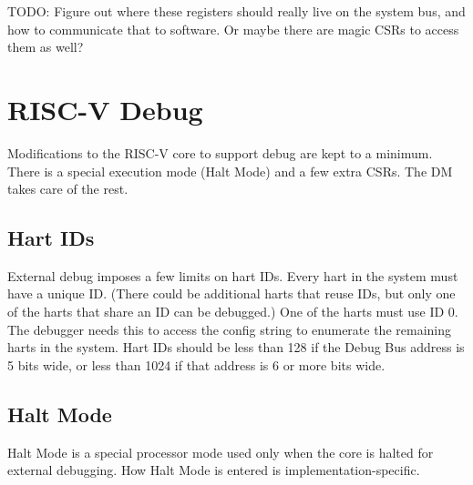 \documentclass{article}
\begin{document}
TODO: Figure out where these registers should really live on the system bus,
and how to communicate that to software. Or maybe there are magic CSRs to
access them as well?



%
%

\section{RISC-V Debug}

Modifications to the RISC-V core to support debug are kept to a minimum.  There
is a special execution mode (Halt Mode) and a few extra CSRs. The DM takes care
of the rest.

\subsection{Hart IDs}

External debug imposes a few limits on hart IDs. Every hart in the system must
have a unique ID. (There could be additional harts that reuse IDs, but only one
of the harts that share an ID can be debugged.) One of the harts must use ID 0.
The debugger needs this to access the config string to enumerate the remaining
harts in the system. Hart IDs should be less than 128 if the Debug Bus address
is 5 bits wide, or less than 1024 if that address is 6 or more bits wide.

\subsection{Halt Mode} \label{haltmode}

Halt Mode is a special processor mode used only when the core is halted for
external debugging. How Halt Mode is entered is implementation-specific.
\end{document}
